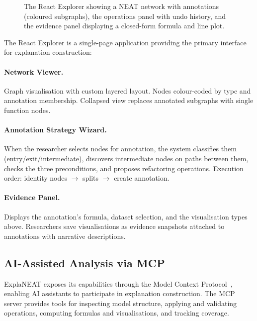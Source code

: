 \documentclass[11pt]{article}
\begin{document}
\begin{figure}[t]
    \centering
    \caption{The React Explorer showing a NEAT network with annotations (coloured subgraphs), the operations panel with undo history, and the evidence panel displaying a closed-form formula and line plot.}
    \label{fig:explorer}
\end{figure}

The React Explorer is a single-page application providing the primary interface for explanation construction:

\paragraph{Network Viewer.} Graph visualisation with custom layered layout. Nodes colour-coded by type and annotation membership. Collapsed view replaces annotated subgraphs with single function nodes.

\paragraph{Annotation Strategy Wizard.} When the researcher selects nodes for annotation, the system classifies them (entry/exit/intermediate), discovers intermediate nodes on paths between them, checks the three preconditions, and proposes refactoring operations. Execution order: identity nodes $\to$ splits $\to$ create annotation.

\paragraph{Evidence Panel.} Displays the annotation's formula, dataset selection, and the visualisation types above. Researchers save visualisations as evidence snapshots attached to annotations with narrative descriptions.

\subsection{AI-Assisted Analysis via MCP}

ExplaNEAT exposes its capabilities through the Model Context Protocol~\cite{anthropic2024mcp}, enabling AI assistants to participate in explanation construction. The MCP server provides tools for inspecting model structure, applying and validating operations, computing formulas and visualisations, and tracking coverage.
\end{document}
